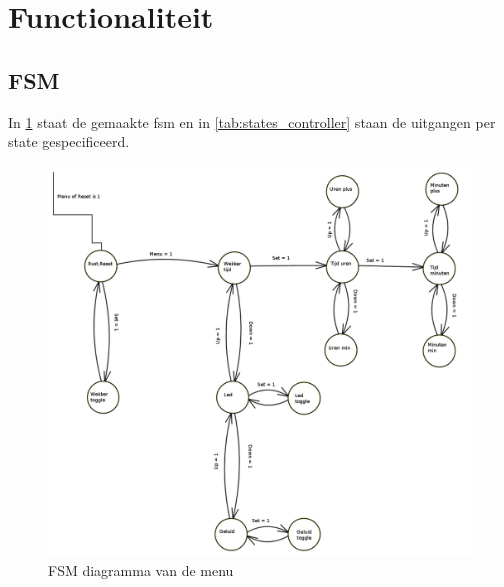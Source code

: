 \section{Functionaliteit}

\subsection{FSM}
In \cref{fig:FSM_controller} staat de gemaakte fsm en in \cref{tab:states_controller} staan de uitgangen per state gespecificeerd.

\begin{figure}[ht!]
\includegraphics[width=\textwidth,height=\textheight,keepaspectratio]{FSM/controller_fsm.png}
\caption{FSM diagramma van de menu}
\label{fig:FSM_controller}
\end{figure}


